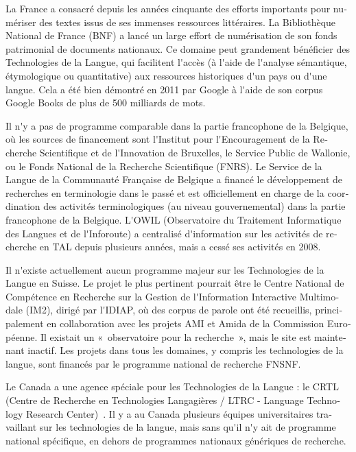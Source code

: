 \begin{french}
\begin{multicols}{2}
La France a consacré depuis les années cinquante des efforts
importants pour numériser des textes issus de ses immenses ressources
littéraires. La Bibliothèque National de France (BNF) a lancé un large
effort de numérisation de son fonds patrimonial de documents
nationaux. Ce domaine peut grandement bénéficier des Technologies de
la Langue, qui facilitent l{\mbox '}accès (à l{\mbox '}aide de l{\mbox '}analyse sémantique,
étymologique ou quantitative) aux ressources historiques d{\mbox '}un pays ou
d{\mbox '}une langue. Cela a été bien démontré en 2011 par Google à l{\mbox '}aide de
son corpus Google Books de plus de 500 milliards de mots.

Il n{\mbox '}y a pas de programme comparable dans la partie francophone de la
Belgique, où les sources de financement sont l{\mbox '}Institut pour
l{\mbox '}Encouragement de la Recherche Scientifique et de l{\mbox '}Innovation de
Bruxelles, le Service Public de Wallonie, ou le Fonds National de la
Recherche Scientifique (FNRS). Le Service de la Langue de la
Communauté Française de Belgique a financé le développement de
recherches en terminologie dans le passé et est officiellement en
charge de la coordination des activités terminologiques (au niveau
gouvernemental) dans la partie francophone de la Belgique. L{\mbox '}OWIL
(Observatoire du Traitement Informatique des Langues et de
l{\mbox '}Inforoute) a centralisé d{\mbox '}information sur les activités de recherche
en TAL depuis plusieurs années, mais a cessé ses activités en 2008.

Il n{\mbox '}existe actuellement aucun programme majeur sur les Technologies
de la Langue en Suisse. Le projet le plus pertinent pourrait être le
Centre National de Compétence en Recherche sur la Gestion de
l{\mbox '}Information Interactive Multimodale (IM2), dirigé par l{\mbox '}IDIAP, où
des corpus de parole ont été recueillis, principalement en
collaboration avec les projets AMI et Amida de la Commission Européenne. Il existait un
«~observatoire pour la recherche~», mais le site est maintenant
inactif. Les projets dans tous les domaines, y compris les
technologies de la langue, sont financés par le programme national de
recherche FNSNF.

Le Canada a une agence spéciale pour les Technologies de la Langue :
le CRTL (Centre de Recherche en Technologies Langagières / LTRC -
Language Technology Research Center)~\cite{canadacrtl}. Il y a au
Canada plusieurs équipes universitaires travaillant sur les
technologies de la langue, mais sans qu{\mbox '}il n{\mbox '}y ait de
programme national spécifique, en dehors de programmes nationaux
génériques de recherche.


\end{multicols}
\end{french}

